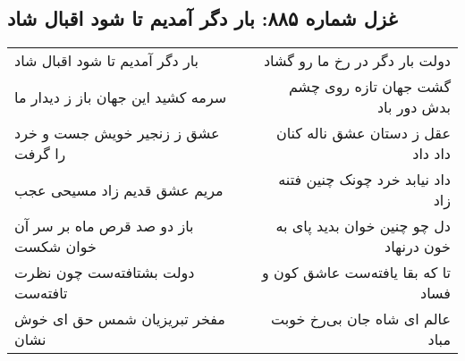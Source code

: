 \begin{center}
\section*{غزل شماره ۸۸۵: بار دگر آمدیم تا شود اقبال شاد}
\label{sec:0885}
\begin{longtable}{l p{0.5cm} r}
بار دگر آمدیم تا شود اقبال شاد
&&
دولت بار دگر در رخ ما رو گشاد
\\
سرمه کشید این جهان باز ز دیدار ما
&&
گشت جهان تازه روی چشم بدش دور باد
\\
عشق ز زنجیر خویش جست و خرد را گرفت
&&
عقل ز دستان عشق ناله کنان داد داد
\\
مریم عشق قدیم زاد مسیحی عجب
&&
داد نیابد خرد چونک چنین فتنه زاد
\\
باز دو صد قرص ماه بر سر آن خوان شکست
&&
دل چو چنین خوان بدید پای به خون درنهاد
\\
دولت بشتافته‌ست چون نظرت تافته‌ست
&&
تا که بقا یافته‌ست عاشق کون و فساد
\\
مفخر تبریزیان شمس حق ای خوش نشان
&&
عالم ای شاه جان بی‌رخ خوبت مباد
\\
\end{longtable}
\end{center}
